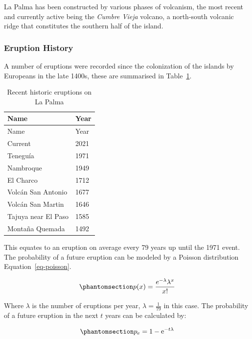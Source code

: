 \documentclass[
]{agujournal2019}
\begin{document}
La Palma has been constructed by various phases of volcanism, the most
recent and currently active being the \emph{Cumbre Vieja} volcano, a
north-south volcanic ridge that constitutes the southern half of the
island.

\subsubsection{Eruption History}\label{eruption-history}

A number of eruptions were recorded since the colonization of the
islands by Europeans in the late 1400s, these are summarised in
Table~\ref{tbl-history}.

\label{tbl-history}
\begin{longtable}[]{@{}ll@{}}
\caption{\label{tbl-history}Recent historic eruptions on La
Palma}\tabularnewline
\toprule\noalign{}
Name & Year \\
\midrule\noalign{}
\endfirsthead
\toprule\noalign{}
Name & Year \\
\midrule\noalign{}
\endhead
\bottomrule\noalign{}
\endlastfoot
Current & 2021 \\
Teneguía & 1971 \\
Nambroque & 1949 \\
El Charco & 1712 \\
Volcán San Antonio & 1677 \\
Volcán San Martin & 1646 \\
Tajuya near El Paso & 1585 \\
Montaña Quemada & 1492 \\
\end{longtable}

This equates to an eruption on average every 79 years up until the 1971
event. The probability of a future eruption can be modeled by a Poisson
distribution Equation~\ref{eq-poisson}.

\begin{equation}\phantomsection\label{eq-poisson}{
p(x)=\frac{e^{-\lambda} \lambda^{x}}{x !}
}\end{equation}

Where \(\lambda\) is the number of eruptions per year,
\(\lambda=\frac{1}{79}\) in this case. The probability of a future
eruption in the next \(t\) years can be calculated by:

\begin{equation}\phantomsection\label{eq-probability}{
p_e = 1-\mathrm{e}^{-t \lambda}
}\end{equation}
\end{document}
